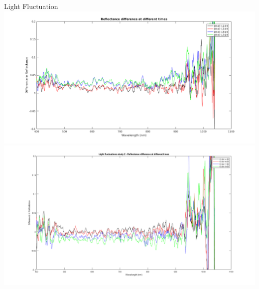 \documentclass[10pt]{beamer}
\begin{document}
\begin{frame}{Light Fluctuation}
\centering
\includegraphics[height=0.35\textheight]{refldiffday.png}
\includegraphics[height=0.35\textheight]{lightstudy2.png}
\end{frame}
\end{document}
